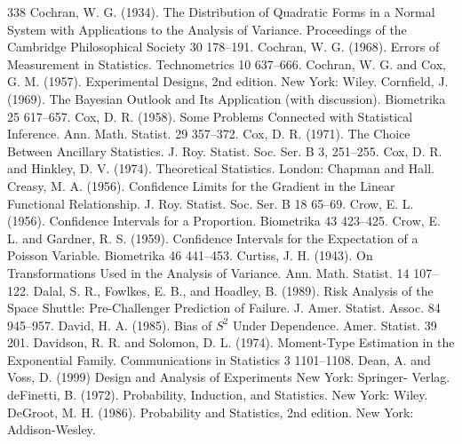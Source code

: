 \begin{thebibliography}{338}
\label{bib:source80} Cochran, W. G. (1934). The Distribution of Quadratic Forms in a Normal System with Applications to the Analysis of Variance. Proceedings of the Cambridge Philosophical Society 30 178–191.
\label{bib:source81} Cochran, W. G. (1968). Errors of Measurement in Statistics. Technometrics 10 637–666.
\label{bib:source82} Cochran, W. G. and Cox, G. M. (1957). Experimental Designs, 2nd edition. New York: Wiley.
\label{bib:source83} Cornfield, J. (1969). The Bayesian Outlook and Its Application (with discussion). Biometrika 25 617–657.
\label{bib:source84} Cox, D. R. (1958). Some Problems Connected with Statistical Inference. Ann. Math. Statist. 29 357–372.
\label{bib:source85} Cox, D. R. (1971). The Choice Between Ancillary Statistics. J. Roy. Statist. Soc. Ser. B 3, 251–255.
\label{bib:source86} Cox, D. R. and Hinkley, D. V. (1974). Theoretical Statistics. London: Chapman and Hall.
\label{bib:source87} Creasy, M. A. (1956). Confidence Limits for the Gradient in the Linear Functional Relationship. J. Roy. Statist. Soc. Ser. B 18 65–69.
\label{bib:source88} Crow, E. L. (1956). Confidence Intervals for a Proportion. Biometrika 43 423–425.
\label{bib:source89} Crow, E. L. and Gardner, R. S. (1959). Confidence Intervals for the Expectation of a Poisson Variable. Biometrika 46 441–453.
\label{bib:source90} Curtiss, J. H. (1943). On Transformations Used in the Analysis of Variance. Ann. Math. Statist. 14 107–122.
\label{bib:source91} Dalal, S. R., Fowlkes, E. B., and Hoadley, B. (1989). Risk Analysis of the Space Shuttle: Pre-Challenger Prediction of Failure. J. Amer. Statist. Assoc. 84 945–957.
\label{bib:source92} David, H. A. (1985). Bias of $S^2$ Under Dependence. Amer. Statist. 39 201.
\label{bib:source93} Davidson, R. R. and Solomon, D. L. (1974). Moment-Type Estimation in the Exponential Family. Communications in Statistics 3 1101–1108.
\label{bib:source94} Dean, A. and Voss, D. (1999) Design and Analysis of Experiments New York: Springer- Verlag.
\label{bib:source95} deFinetti, B. (1972). Probability, Induction, and Statistics. New York: Wiley.
\label{bib:source96} DeGroot, M. H. (1986). Probability and Statistics, 2nd edition. New York: Addison-Wesley.

\end{thebibliography}
